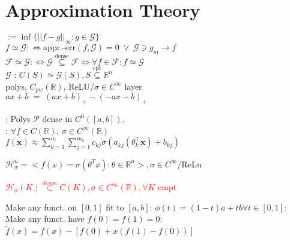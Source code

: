 \section{Approximation Theory}
 $:= \inf\{ ||f - g||_{\infty} : g \in \mathcal{G}\}$ \\

$f \simeq \mathcal{G}:\iff \text{appr.-err}(f, \mathcal{G}) = 0 \; \lor \; \mathcal{G} \ni g_m \rightarrow f$ \\
$\mathcal{F} \simeq \mathcal{G}:\iff \mathcal{G} \stackrel{\text{dense}}{\subseteq} \mathcal{F} \iff \forall f \in \mathcal{F}: f \simeq \mathcal{G}$\\
$\mathcal{G}$ : $C(S) \simeq \mathcal{G}(S), S \stackrel{\text{cpt}}{\subseteq} \mathbb{R}^n$\\
polys, $C_{pw}(\mathbb{R})$, ReLU/$\sigma\in C^\infty$ layer\\
$ax + b \; = \; (ax + b)_+ - (-ax - b)_+$

: Polys $\mathcal{P}$ dense in $C^0([a,b])$. \\
: $\forall f\in C(\mathbb{R})$, $\sigma \in C^{\infty}(\mathbb{R})$ \\
$f(\mathbf{x}) \approx \sum_{k=1}^m \sum_{j=1}^{m_k} c_{kj} \sigma(a_{kj}(\theta_k^{\top} \mathbf{x}) + b_{kj})$

$\mathcal{H}^n_{\sigma}=<f(x)= \sigma(\theta^Tx) : \theta\in\mathbb{R}^n>, \sigma\in C^{\infty}$/ReLu

\textcolor{red}
{ $\mathcal{H}_{\sigma}(K)\stackrel{dense}{\subset} C(K), \sigma\in C^{\infty}(\mathbb{R}),\forall K$ cmpt}

Make any funct. on $[0, 1]$ fit to $[a, b]$: $\phi(t) = (1 - t)a + tb \forall t \in [0, 1]$;
Make any funct. have $f(0)=f(1)=0$:
$\tilde{f}(x) = f(x) - [f(0) + x(f(1) - f(0))]$